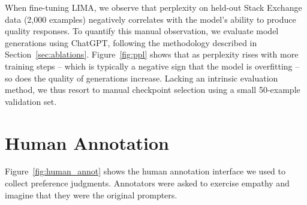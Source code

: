 \documentclass{article}
\begin{document}
When fine-tuning LIMA, we observe that perplexity on held-out Stack Exchange data (2,000 examples) negatively correlates with the model's ability to produce quality responses.
To quantify this manual observation, we evaluate model generations using ChatGPT, following the methodology described in Section~\ref{sec:ablations}.
Figure~\ref{fig:ppl} shows that as perplexity rises with more training steps -- which is typically a negative sign that the model is overfitting -- so does the quality of generations increase.
Lacking an intrinsic evaluation method, we thus resort to manual checkpoint selection using a small 50-example validation set.

\section{Human Annotation}
\label{sec:annotation}

Figure~\ref{fig:human_annot} shows the human annotation interface we used to collect preference judgments. Annotators were asked to exercise empathy and imagine that they were the original prompters.
\end{document}
